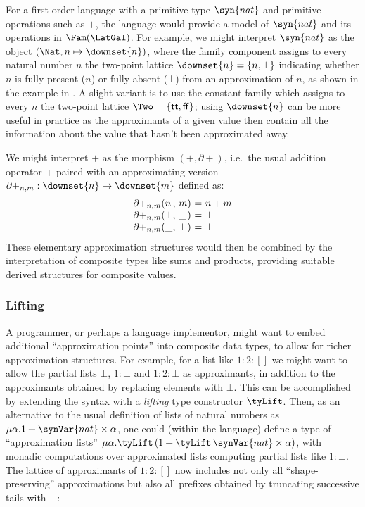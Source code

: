 For a first-order language with a primitive type $\syn{nat}$ and primitive operations such as $+$, the
language would provide a model of $\syn{nat}$ and its operations in $\Fam(\LatGal)$. For example, we might
interpret $\syn{nat}$ as the object $(\Nat,n \mapsto \downset{n})$, where the family component assigns to
every natural number $n$ the two-point lattice $\downset{n} = \{n, \bot\}$ indicating whether $n$ is fully
present ($n$) or fully absent ($\bot$) from an approximation of $n$, as shown in the example in
. A slight variant is to use the constant family which assigns to every $n$ the two-point
lattice $\Two = \{\mathsf{tt},\mathsf{ff}\}$; using $\downset{n}$ can be more useful in practice as the
approximants of a given value then contain all the information about the value that hasn't been approximated
away.

We might interpret $+$ as the morphism $(+,\partial+)$, i.e.~the usual addition operator + paired with an
approximating version $\partial+_{n,m}: \downset{n} \to \downset{m}$ defined as:
\begin{displaymath}
    \begin{array}[t]{l@{(}l@{,~}l@{)~}c@{~}l}
      \partial+_{n,m}&n&m&=&n + m \\
      \partial+_{n,m}&\bot&\_&=&\bot \\
      \partial+_{n,m}&\_&\bot&=&\bot
    \end{array}
\end{displaymath}
These elementary approximation structures would then be combined by the interpretation of composite types like
sums and products, providing suitable derived structures for composite values.

\subsubsection{Lifting}

A programmer, or perhaps a language implementor, might want to embed additional ``approximation points'' into
composite data types, to allow for richer approximation structures. For example, for a list like $1 : 2 : []$
we might want to allow the partial lists $\bot$, $1 : \bot$ and $1 : 2 : \bot$ as approximants, in addition to
the approximants obtained by replacing elements with $\bot$. This can be accomplished by extending the syntax
with a \emph{lifting} type constructor $\tyLift$. Then, as an alternative to the usual definition of lists of
natural numbers as $\mu\alpha.1 + \synVar{nat} \times \alpha$, one could (within the language) define a type
of ``approximation lists'' $\mu\alpha.\tyLift\,(1 + \tyLift\,\synVar{nat} \times \alpha)$, with monadic
computations over approximated lists computing partial lists like $1 : \bot$. The lattice of approximants of
$1 : 2 : []$ now includes not only all ``shape-preserving'' approximations but also all prefixes obtained by
truncating successive tails with $\bot$:

